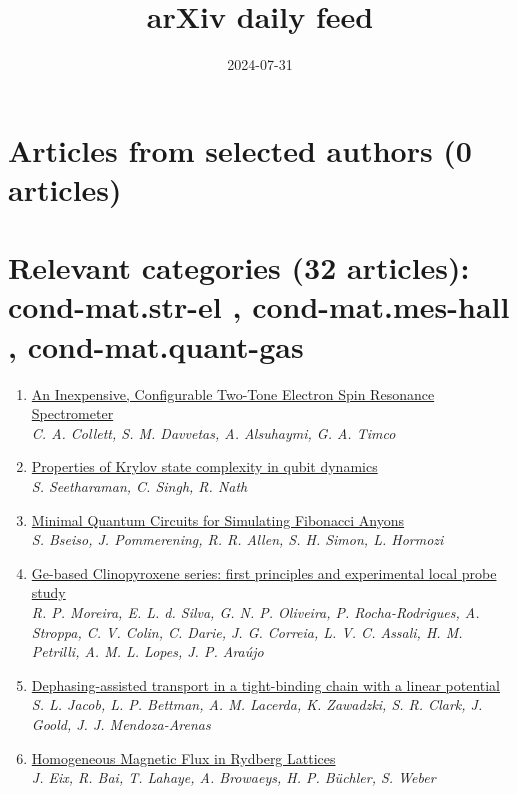 \documentclass{article}
\title{arXiv daily feed}
\author{}
\date{2024-07-31}
\begin{document}
\maketitle

\section*{Articles from selected authors (0 articles)}
\section*{Relevant categories (32 articles): 
cond-mat.str-el
, 
cond-mat.mes-hall
, 
cond-mat.quant-gas
}
\begin{enumerate}
\item\href{http://arxiv.org/abs/2407.21782v1}{\textsf{An Inexpensive, Configurable Two-Tone Electron Spin Resonance
  Spectrometer}}\\
{\small\color{blue}\textsl{C. A. Collett, S. M. Davvetas, A. Alsuhaymi, G. A. Timco}}
\item\href{http://arxiv.org/abs/2407.21776v1}{\textsf{Properties of Krylov state complexity in qubit dynamics}}\\
{\small\color{blue}\textsl{S. Seetharaman, C. Singh, R. Nath}}
\item\href{http://arxiv.org/abs/2407.21761v1}{\textsf{Minimal Quantum Circuits for Simulating Fibonacci Anyons}}\\
{\small\color{blue}\textsl{S. Bseiso, J. Pommerening, R. R. Allen, S. H. Simon, L. Hormozi}}
\item\href{http://arxiv.org/abs/2407.21749v1}{\textsf{Ge-based Clinopyroxene series: first principles and experimental local
  probe study}}\\
{\small\color{blue}\textsl{R. P. Moreira, E. L. d. Silva, G. N. P. Oliveira, P. Rocha-Rodrigues, A. Stroppa, C. V. Colin, C. Darie, J. G. Correia, L. V. C. Assali, H. M. Petrilli, A. M. L. Lopes, J. P. Araújo}}
\item\href{http://arxiv.org/abs/2407.21715v1}{\textsf{Dephasing-assisted transport in a tight-binding chain with a linear
  potential}}\\
{\small\color{blue}\textsl{S. L. Jacob, L. P. Bettman, A. M. Lacerda, K. Zawadzki, S. R. Clark, J. Goold, J. J. Mendoza-Arenas}}
\item\href{http://arxiv.org/abs/2407.21681v1}{\textsf{Homogeneous Magnetic Flux in Rydberg Lattices}}\\
{\small\color{blue}\textsl{J. Eix, R. Bai, T. Lahaye, A. Browaeys, H. P. Büchler, S. Weber}}

\end{enumerate}
\end{document}
